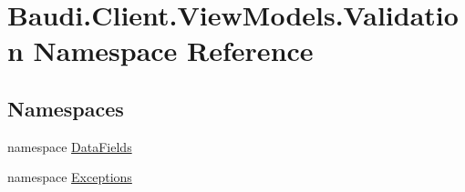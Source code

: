 \hypertarget{namespace_baudi_1_1_client_1_1_view_models_1_1_validation}{}\section{Baudi.\+Client.\+View\+Models.\+Validation Namespace Reference}
\label{namespace_baudi_1_1_client_1_1_view_models_1_1_validation}
\subsection*{Namespaces}
\begin{DoxyCompactItemize}
\item 
namespace \hyperlink{namespace_baudi_1_1_client_1_1_view_models_1_1_validation_1_1_data_fields}{Data\+Fields}
\item 
namespace \hyperlink{namespace_baudi_1_1_client_1_1_view_models_1_1_validation_1_1_exceptions}{Exceptions}
\end{DoxyCompactItemize}
